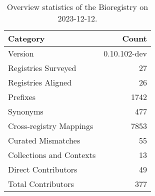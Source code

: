 \begin{table}
\caption{Overview statistics of the Bioregistry on 2023-12-12.}
\label{tab:bioregistry-summary}
\begin{tabular}{lr}
\toprule
Category & Count \\
\midrule
Version & 0.10.102-dev \\
Registries Surveyed & 27 \\
Registries Aligned & 26 \\
Prefixes & 1742 \\
Synonyms & 477 \\
Cross-registry Mappings & 7853 \\
Curated Mismatches & 55 \\
Collections and Contexts & 13 \\
Direct Contributors & 49 \\
Total Contributors & 377 \\
\bottomrule
\end{tabular}
\end{table}
